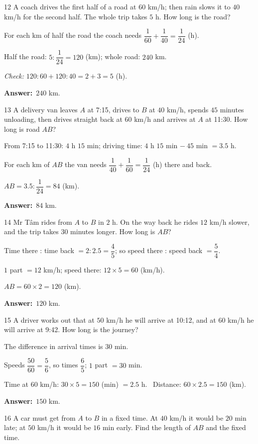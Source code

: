 \documentclass[11pt]{article}
\newif\ifsol \solfalse
\providecommand{\AnsWord}{Đáp số}
\newcommand{\dapso}[1]{\par\textbf{\AnsWord:}\ #1}
\newcommand{\probsol}[1]{%
  \begin{lrbox}{\solmeasure}\begin{minipage}{\dimexpr\linewidth-24pt\relax}#1\end{minipage}\end{lrbox}%
  \ifsol
    \begin{solbox}#1\end{solbox}%
  \else
    \setlength{\solht}{\dimexpr\ht\solmeasure+\dp\solmeasure+0.85cm\relax}%
    \ifdim\solht<1.35cm\setlength{\solht}{1.35cm}\fi
    \begin{tcolorbox}[colback=white,colframe=Line,boxrule=0.8pt,arc=5pt,
      left=8pt,right=8pt,top=4pt,bottom=4pt,height=\solht]{\footnotesize\color{Slate}\itshape\WorkWord}\end{tcolorbox}%
  \fi}
\newcommand{\gap}{\vspace{0.3cm}}
\def\WorkWord{Your work:}
\def\AnsWord{Answer}
\begin{document}
\gap
\begin{probbox}{12}{\relax}
A coach drives the first half of a road at $60$ km/h; then rain slows it to $40$ km/h for the second half. The whole trip takes $5$ h. How long is the road?
\end{probbox}
\probsol{
For each km of half the road the coach needs $\dfrac1{60}+\dfrac1{40}=\dfrac1{24}$ (h).\par
Half the road: $5:\dfrac1{24}=120$ (km); whole road: $240$ km.\par
\emph{Check:} $120:60+120:40=2+3=5$ (h).
\dapso{$240$ km.}}
\gap
\begin{probbox}{13}{\relax}
A delivery van leaves $A$ at 7:15, drives to $B$ at $40$ km/h, spends $45$ minutes unloading, then drives straight back at $60$ km/h and arrives at $A$ at 11:30. How long is road $AB$?
\end{probbox}
\probsol{
From 7:15 to 11:30: $4$ h $15$ min; driving time: $4$ h $15$ min $-\ 45$ min $=3.5$ h.\par
For each km of $AB$ the van needs $\dfrac1{40}+\dfrac1{60}=\dfrac1{24}$ (h) there and back.\par $AB=3.5:\dfrac1{24}=84$ (km).
\dapso{$84$ km.}}
\gap
\begin{probbox}{14}{\relax}
Mr Tâm rides from $A$ to $B$ in $2$ h. On the way back he rides $12$ km/h slower, and the trip takes $30$ minutes longer. How long is $AB$?
\end{probbox}
\probsol{
Time there : time back $=2:2.5=\dfrac45$; so speed there : speed back $=\dfrac54$.\par
$1$ part $=12$ km/h; speed there: $12\times5=60$ (km/h).\par $AB=60\times2=120$ (km).
\dapso{$120$ km.}}
\gap
\begin{probbox}{15}{\relax}
A driver works out that at $50$ km/h he will arrive at 10:12, and at $60$ km/h he will arrive at 9:42. How long is the journey?
\end{probbox}
\probsol{
The difference in arrival times is $30$ min.\par Speeds $\dfrac{50}{60}=\dfrac56$, so times $\dfrac65$; $1$ part $=30$ min.\par
Time at $60$ km/h: $30\times5=150$ (min) $=2.5$ h. \ Distance: $60\times2.5=150$ (km).
\dapso{$150$ km.}}
\gap
\begin{probbox}{16}{\relax}
A car must get from $A$ to $B$ in a fixed time. At $40$ km/h it would be $20$ min late; at $50$ km/h it would be $16$ min early. Find the length of $AB$ and the fixed time.
\end{probbox}
\end{document}

